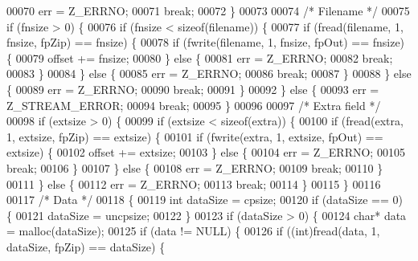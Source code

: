 \begin{DoxyCode}
00070           err = Z\_ERRNO;
00071           \textcolor{keywordflow}{break};
00072         \}
00073 
00074         \textcolor{comment}{/* Filename */}
00075         \textcolor{keywordflow}{if} (fnsize > 0) \{
00076           \textcolor{keywordflow}{if} (fnsize < \textcolor{keyword}{sizeof}(filename)) \{
00077             \textcolor{keywordflow}{if} (fread(filename, 1, fnsize, fpZip) == fnsize) \{
00078                 \textcolor{keywordflow}{if} (fwrite(filename, 1, fnsize, fpOut) == fnsize) \{
00079                 offset += fnsize;
00080               \} \textcolor{keywordflow}{else} \{
00081                 err = Z\_ERRNO;
00082                 \textcolor{keywordflow}{break};
00083               \}
00084             \} \textcolor{keywordflow}{else} \{
00085               err = Z\_ERRNO;
00086               \textcolor{keywordflow}{break};
00087             \}
00088           \} \textcolor{keywordflow}{else} \{
00089             err = Z\_ERRNO;
00090             \textcolor{keywordflow}{break};
00091           \}
00092         \} \textcolor{keywordflow}{else} \{
00093           err = Z\_STREAM\_ERROR;
00094           \textcolor{keywordflow}{break};
00095         \}
00096 
00097         \textcolor{comment}{/* Extra field */}
00098         \textcolor{keywordflow}{if} (extsize > 0) \{
00099           \textcolor{keywordflow}{if} (extsize < \textcolor{keyword}{sizeof}(extra)) \{
00100             \textcolor{keywordflow}{if} (fread(extra, 1, extsize, fpZip) == extsize) \{
00101               \textcolor{keywordflow}{if} (fwrite(extra, 1, extsize, fpOut) == extsize) \{
00102                 offset += extsize;
00103                 \} \textcolor{keywordflow}{else} \{
00104                 err = Z\_ERRNO;
00105                 \textcolor{keywordflow}{break};
00106               \}
00107             \} \textcolor{keywordflow}{else} \{
00108               err = Z\_ERRNO;
00109               \textcolor{keywordflow}{break};
00110             \}
00111           \} \textcolor{keywordflow}{else} \{
00112             err = Z\_ERRNO;
00113             \textcolor{keywordflow}{break};
00114           \}
00115         \}
00116 
00117         \textcolor{comment}{/* Data */}
00118         \{
00119           \textcolor{keywordtype}{int} dataSize = cpsize;
00120           \textcolor{keywordflow}{if} (dataSize == 0) \{
00121             dataSize = uncpsize;
00122           \}
00123           \textcolor{keywordflow}{if} (dataSize > 0) \{
00124             \textcolor{keywordtype}{char}* data = malloc(dataSize);
00125             \textcolor{keywordflow}{if} (data != NULL) \{
00126               \textcolor{keywordflow}{if} ((\textcolor{keywordtype}{int})fread(data, 1, dataSize, fpZip) == dataSize) \{

\end{DoxyCode}
